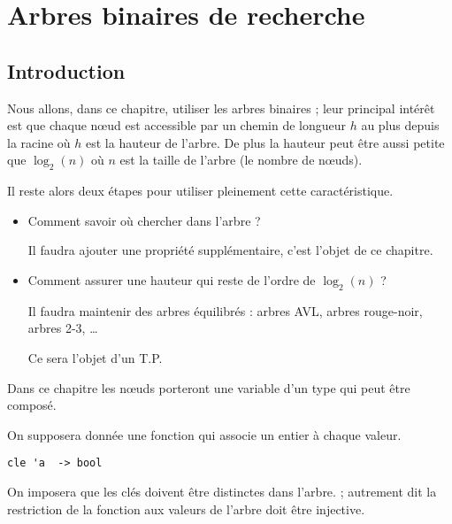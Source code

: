 \chapter{Arbres binaires de recherche}
\section{Introduction}

Nous allons, dans ce chapitre, utiliser les arbres binaires ; leur principal intérêt est que chaque nœud est accessible par un chemin de longueur $h$ au plus depuis la racine  où $h$ est la hauteur de l'arbre. De plus la hauteur peut être aussi petite que $\log_2(n)$ où $n$ est la taille de l'arbre (le nombre de nœuds).

\medskip

Il reste alors deux étapes pour utiliser pleinement cette caractéristique.
\begin{itemize}
\item Comment savoir où chercher dans l'arbre ?

Il faudra ajouter une propriété supplémentaire, c'est l'objet de ce chapitre.

\item Comment assurer une hauteur qui reste de l'ordre de $\log_2(n)$ ?

Il faudra maintenir des arbres équilibrés : arbres AVL, arbres rouge-noir, arbres 2-3, \dots

Ce sera l'objet d'un T.P.
\end{itemize}

Dans ce chapitre les nœuds porteront une variable d'un type qui peut être composé.

On supposera donnée une fonction  qui associe un entier à chaque valeur.
\begin{lstlisting}
cle 'a  -> bool
\end{lstlisting} 
On imposera que les clés doivent être distinctes dans l'arbre. ; autrement dit la restriction de la fonction  aux valeurs de l'arbre doit être injective.

